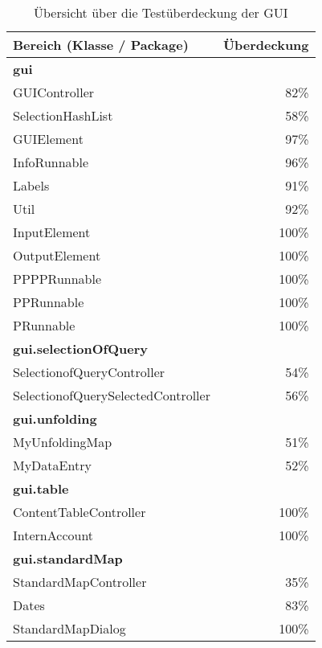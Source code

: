 \begin{table}[h]
	\centering
	\begin{tabular} {l||r}
		\label{tbl:coverageGui}
		Bereich (Klasse / Package) & Überdeckung \\
		\hline
		\hline
		\textbf{gui} \\
		\hspace*{3mm}GUIController & 82\% \\
		\hspace*{3mm}SelectionHashList & 58\% \\
		\hspace*{3mm}GUIElement & 97\% \\
		\hspace*{3mm}InfoRunnable & 96\% \\
		\hspace*{3mm}Labels & 91\% \\
		\hspace*{3mm}Util & 92\% \\
		\hspace*{3mm}InputElement & 100\% \\
		\hspace*{3mm}OutputElement & 100\% \\
		\hspace*{3mm}PPPPRunnable & 100\% \\
		\hspace*{3mm}PPRunnable & 100\% \\
		\hspace*{3mm}PRunnable & 100\% \\
		\hline
		\textbf{gui.selectionOfQuery} \\
		\hspace*{3mm}SelectionofQueryController & 54\% \\
		\hspace*{3mm}SelectionofQuerySelectedController & 56\% \\
		\hline
		\textbf{gui.unfolding} \\
		\hspace*{3mm}MyUnfoldingMap & 51\% \\
		\hspace*{3mm}MyDataEntry & 52\% \\
		\hline
		\textbf{gui.table} \\
		\hspace*{3mm}ContentTableController & 100\% \\
		\hspace*{3mm}InternAccount & 100\% \\
		\hline
		\textbf{gui.standardMap} \\
		\hspace*{3mm}StandardMapController & 35\% \\
		\hspace*{3mm}Dates & 83\% \\
		\hspace*{3mm}StandardMapDialog & 100\% \\
	\end{tabular}
	\caption{Übersicht über die Testüberdeckung der GUI}
\end{table}
